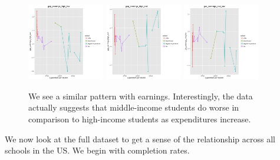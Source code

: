 \documentclass{article}
\begin{document}
\begin{figure}[H]
\centering
\includegraphics[width=0.3\textwidth]{../images/eda_scatterplots/gap_earnings_high_low_cohort.png}
\includegraphics[width=0.3\textwidth]{../images/eda_scatterplots/gap_earnings_high_mid_cohort.png}
\includegraphics[width=0.3\textwidth]{../images/eda_scatterplots/gap_earnings_mid_low_cohort.png}
\caption{\label{fig:EarningsCohorts} We see a similar pattern with earnings. Interestingly, the data actually suggests that middle-income students do worse in comparison to high-income students as expenditures increase.}
\end{figure}


We now look at the full dataset to get a sense of the relationship across all schools in the US. We begin with completion rates.
\end{document}
